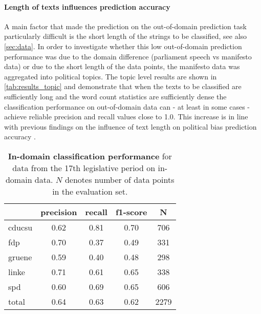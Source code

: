 \documentclass[11pt]{article}
\begin{document}
\paragraph{Length of texts influences prediction accuracy}
A main factor that made the prediction on the out-of-domain prediction task particularly difficult is the short length of the strings to be classified, see also \autoref{sec:data}. In order to investigate whether this low out-of-domain prediction performance was due to the domain difference (parliament speech vs manifesto data) or due to the short length of the data points, the manifesto data was aggregated into political topics. The topic level results are shown in \autoref{tab:results_topic} and demonstrate that when the texts to be classified are sufficiently long and the word count statistics are sufficiently dense the classification performance on out-of-domain data can - at least in some cases - achieve reliable precision and recall values close to 1.0. This increase is in line with previous findings on the influence of text length on political bias prediction accuracy \cite{Hirst2014}.


\begin{table}[t]
\caption{
\label{tab:results_in-domain}
{\bf In-domain classification performance} for data from the 17th legislative period on in-domain data. $N$ denotes number of data points in the evaluation set.
}
\begin{center}
\begin{tabular}{lcccc}
    &         precision    &recall &  f1-score  & N  \\
\hline \hline
       cducsu   &    0.62  &    0.81  &    0.70  &     706\\
        fdp    &   0.70   &   0.37  &    0.49    &   331\\
     gruene &      0.59  &    0.40   &   0.48   &    298\\
      linke    &   0.71   &   0.61  &    0.65    &   338\\
        spd   &    0.60   &   0.69  &    0.65   &    606\\
\hline
 total &      0.64   &   0.63   &   0.62    &  2279 
%
\end{tabular}
\end{center}
\end{table}
\end{document}
